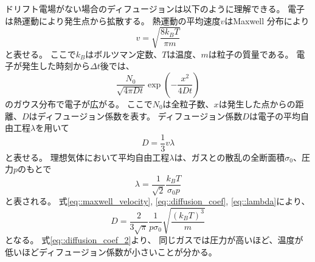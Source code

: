 \documentclass[../master]{subfiles}
\begin{document}
ドリフト電場がない場合のディフュージョンは以下のように理解できる。
電子は熱運動により発生点から拡散する。
熱運動の平均速度$v$はMaxwell 分布により
\begin{equation}
  v = \sqrt{\frac{8k_{B}T}{\pi m}}
  \label{eq::maxwell_velocity}
\end{equation}
と表せる。
ここで$k_{B}$はボルツマン定数、$T$は温度、$m$は粒子の質量である。
電子が発生した時刻から$\Delta t$後では、
\begin{equation}
  \frac{N_0}{\sqrt{4\pi D t}}\exp\left(-\frac{x^{2}}{4 D t}\right)
  \label{eq::gaus_dist}
\end{equation}
のガウス分布で電子が広がる。
ここで$N_{0}$は全粒子数、$x$は発生した点からの距離、$D$はディフュージョン係数を表す。
ディフュージョン係数$D$は電子の平均自由工程$\lambda$を用いて
\begin{equation}
  D = \frac{1}{3}v\lambda
  \label{eq::diffusion_coef}
\end{equation}
と表せる。
理想気体において平均自由工程$\lambda$は、ガスとの散乱の全断面積$\sigma_{0}$、圧力$p$のもとで
\begin{equation}
  \lambda = \frac{1}{\sqrt{2}}\frac{k_{B}T}{\sigma_{0}p}
  \label{eq::lambda}
\end{equation}
と表される。
式\ref{eq::maxwell_velocity}, \ref{eq::diffusion_coef}, \ref{eq::lambda}により、
\begin{equation}
  D = \frac{2}{3\sqrt{\pi}}\frac{1}{p\sigma_{0}}\sqrt{\frac{\left(k_{B}T\right)^{3}}{m}}
  \label{eq::diffusion_coef_2}
\end{equation}
となる。
式\ref{eq::diffusion_coef_2}より、
同じガスでは圧力が高いほど、温度が低いほどディフュージョン係数が小さいことが分かる。
\end{document}
